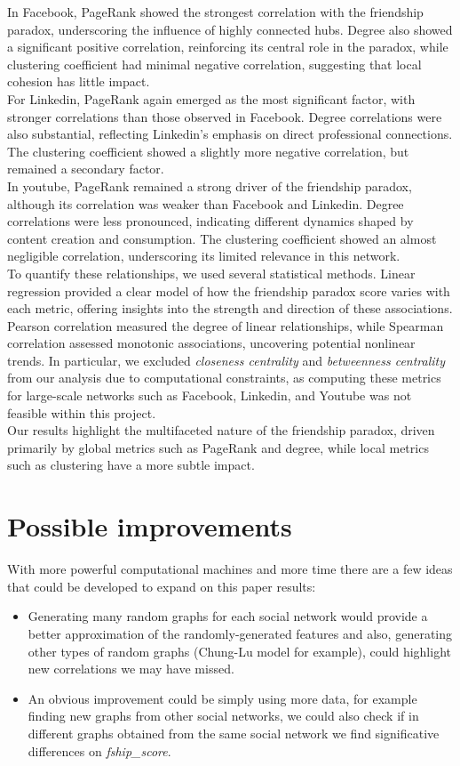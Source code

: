 \documentclass{article}
\begin{document}
In Facebook, PageRank showed the strongest correlation with the friendship paradox, underscoring the influence of highly connected hubs. Degree also showed a significant positive correlation, reinforcing its central role in the paradox, while clustering coefficient had minimal negative correlation, suggesting that local cohesion has little impact. \\
For Linkedin, PageRank again emerged as the most significant factor, with stronger correlations than those observed in Facebook. Degree correlations were also substantial, reflecting Linkedin's emphasis on direct professional connections. The clustering coefficient showed a slightly more negative correlation, but remained a secondary factor. \\ 
In youtube, PageRank remained a strong driver of the friendship paradox, although its correlation was weaker than Facebook and Linkedin. Degree correlations were less pronounced, indicating different dynamics shaped by content creation and consumption. The clustering coefficient showed an almost negligible correlation, underscoring its limited relevance in this network. \\

To quantify these relationships, we used several statistical methods. 
Linear regression provided a clear model of how the friendship paradox score varies with each metric, offering insights into the strength and direction of these associations. 
Pearson correlation measured the degree of linear relationships, while Spearman correlation assessed monotonic associations, uncovering potential nonlinear trends. In particular, we excluded \textit{closeness centrality} and \textit{betweenness centrality} from our analysis due to computational constraints, as computing these metrics for large-scale networks such as Facebook, Linkedin, and Youtube was not feasible within this project. \\
Our results highlight the multifaceted nature of the friendship paradox, driven primarily by global metrics such as PageRank and degree, while local metrics such as clustering have a more subtle impact.

\section{Possible improvements}
With more powerful computational machines and more time there are a few ideas that could be developed to expand on this paper results:
\begin{itemize}
    \item Generating many random graphs for each social network would provide a better approximation of the randomly-generated features and also, generating other types of random graphs (Chung-Lu model for example), could highlight new correlations we may have missed.
    \item An obvious improvement could be simply using more data, for example finding new graphs from other social networks, we could also check if in different graphs obtained from the same social network we find significative differences on \textit{fship\_score}.
\end{itemize}
\end{document}
